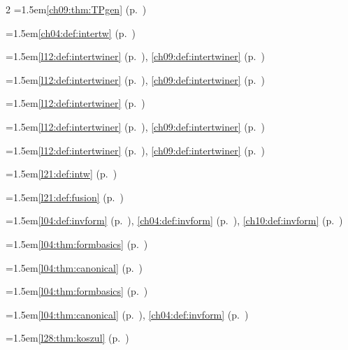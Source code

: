 \begin{multicols}{2}
\hangindent=1.5em\quad \ref{ch09:thm:TPgen} (p.~\pageref{ch09:thm:TPgen})\par
\hangindent=1.5em\quad \ref{ch04:def:intertw} (p.~\pageref{ch04:def:intertw})\par
\hangindent=1.5em\quad \ref{l12:def:intertwiner} (p.~\pageref{l12:def:intertwiner}), \ref{ch09:def:intertwiner} (p.~\pageref{ch09:def:intertwiner})\par
\hangindent=1.5em\quad \ref{l12:def:intertwiner} (p.~\pageref{l12:def:intertwiner}), \ref{ch09:def:intertwiner} (p.~\pageref{ch09:def:intertwiner})\par
\hangindent=1.5em\quad \ref{l12:def:intertwiner} (p.~\pageref{l12:def:intertwiner})\par
\hangindent=1.5em\quad \ref{l12:def:intertwiner} (p.~\pageref{l12:def:intertwiner}), \ref{ch09:def:intertwiner} (p.~\pageref{ch09:def:intertwiner})\par
\hangindent=1.5em\quad \ref{l12:def:intertwiner} (p.~\pageref{l12:def:intertwiner}), \ref{ch09:def:intertwiner} (p.~\pageref{ch09:def:intertwiner})\par
\hangindent=1.5em\quad \ref{l21:def:intw} (p.~\pageref{l21:def:intw})\par
\hangindent=1.5em\quad \ref{l21:def:fusion} (p.~\pageref{l21:def:fusion})\par
\hangindent=1.5em\quad \ref{l04:def:invform} (p.~\pageref{l04:def:invform}), \ref{ch04:def:invform} (p.~\pageref{ch04:def:invform}), \ref{ch10:def:invform} (p.~\pageref{ch10:def:invform})\par
\hangindent=1.5em\quad \ref{l04:thm:formbasics} (p.~\pageref{l04:thm:formbasics})\par
\hangindent=1.5em\quad \ref{l04:thm:canonical} (p.~\pageref{l04:thm:canonical})\par
\hangindent=1.5em\quad \ref{l04:thm:formbasics} (p.~\pageref{l04:thm:formbasics})\par
\hangindent=1.5em\quad \ref{l04:thm:canonical} (p.~\pageref{l04:thm:canonical}), \ref{ch04:def:invform} (p.~\pageref{ch04:def:invform})\par
\hangindent=1.5em\quad \ref{l28:thm:koszul} (p.~\pageref{l28:thm:koszul})\par

\end{multicols}
